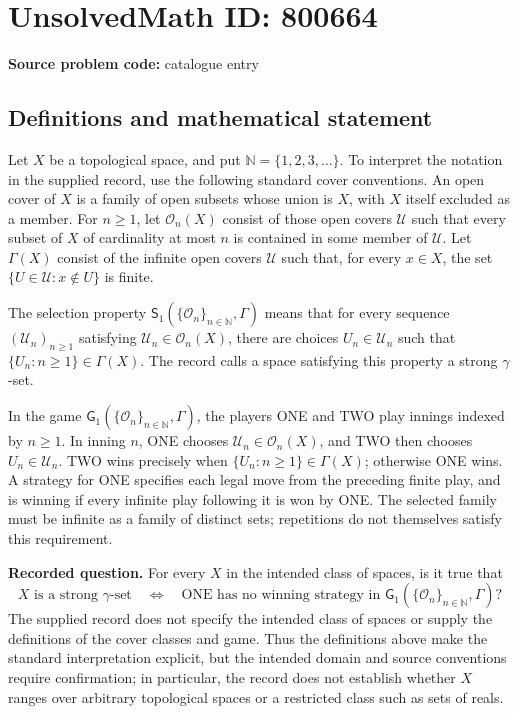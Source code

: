 \documentclass[11pt]{article}
\begin{document}
\section*{UnsolvedMath ID: 800664}
\textbf{Source problem code:} catalogue entry
\subsection{Definitions and mathematical statement}
Let \(X\) be a topological space, and put \(\mathbb{N}=\{1,2,3,\ldots\}\). To interpret the notation in the supplied record, use the following standard cover conventions. An open cover of \(X\) is a family of open subsets whose union is \(X\), with \(X\) itself excluded as a member. For \(n\geq 1\), let \(\mathcal{O}_n(X)\) consist of those open covers \(\mathcal{U}\) such that every subset of \(X\) of cardinality at most \(n\) is contained in some member of \(\mathcal{U}\). Let \(\Gamma(X)\) consist of the infinite open covers \(\mathcal{U}\) such that, for every \(x\in X\), the set \(\{U\in\mathcal{U}:x\notin U\}\) is finite.

The selection property \(\mathsf{S}_1(\{\mathcal{O}_n\}_{n\in\mathbb{N}},\Gamma)\) means that for every sequence \((\mathcal{U}_n)_{n\geq1}\) satisfying \(\mathcal{U}_n\in\mathcal{O}_n(X)\), there are choices \(U_n\in\mathcal{U}_n\) such that \(\{U_n:n\geq1\}\in\Gamma(X)\). The record calls a space satisfying this property a strong \(\gamma\)-set.

In the game \(\mathsf{G}_1(\{\mathcal{O}_n\}_{n\in\mathbb{N}},\Gamma)\), the players ONE and TWO play innings indexed by \(n\geq1\). In inning \(n\), ONE chooses \(\mathcal{U}_n\in\mathcal{O}_n(X)\), and TWO then chooses \(U_n\in\mathcal{U}_n\). TWO wins precisely when \(\{U_n:n\geq1\}\in\Gamma(X)\); otherwise ONE wins. A strategy for ONE specifies each legal move from the preceding finite play, and is winning if every infinite play following it is won by ONE. The selected family must be infinite as a family of distinct sets; repetitions do not themselves satisfy this requirement.

\textbf{Recorded question.} For every \(X\) in the intended class of spaces, is it true that
\[
X\text{ is a strong }\gamma\text{-set}
\quad\Longleftrightarrow\quad
\text{ONE has no winning strategy in }
\mathsf{G}_1(\{\mathcal{O}_n\}_{n\in\mathbb{N}},\Gamma)?
\]
The supplied record does not specify the intended class of spaces or supply the definitions of the cover classes and game. Thus the definitions above make the standard interpretation explicit, but the intended domain and source conventions require confirmation; in particular, the record does not establish whether \(X\) ranges over arbitrary topological spaces or a restricted class such as sets of reals.
\end{document}

